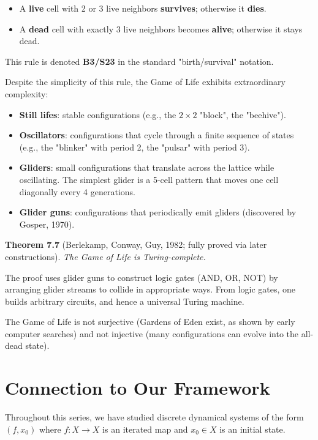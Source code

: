\begin{itemize}
\item A \textbf{live} cell with 2 or 3 live neighbors \textbf{survives}; otherwise it \textbf{dies}.
\item A \textbf{dead} cell with exactly 3 live neighbors becomes \textbf{alive}; otherwise it stays dead.
\end{itemize}

This rule is denoted \textbf{B3/S23} in the standard "birth/survival" notation.

Despite the simplicity of this rule, the Game of Life exhibits extraordinary complexity:

\begin{itemize}
\item \textbf{Still lifes}: stable configurations (e.g., the $2 \times 2$ "block", the "beehive").
\item \textbf{Oscillators}: configurations that cycle through a finite sequence of states (e.g., the "blinker" with period 2, the "pulsar" with period 3).
\item \textbf{Gliders}: small configurations that translate across the lattice while oscillating. The simplest glider is a 5-cell pattern that moves one cell diagonally every 4 generations.
\item \textbf{Glider guns}: configurations that periodically emit gliders (discovered by Gosper, 1970).
\end{itemize}

\textbf{Theorem 7.7} (Berlekamp, Conway, Guy, 1982; fully proved via later constructions). \textit{The Game of Life is Turing-complete.}

The proof uses glider guns to construct logic gates (AND, OR, NOT) by arranging glider streams to collide in appropriate ways. From logic gates, one builds arbitrary circuits, and hence a universal Turing machine.

The Game of Life is not surjective (Gardens of Eden exist, as shown by early computer searches) and not injective (many configurations can evolve into the all-dead state).


\section{Connection to Our Framework}

Throughout this series, we have studied discrete dynamical systems of the form $(f, x_0)$ where $f: X \to X$ is an iterated map and $x_0 \in X$ is an initial state.

